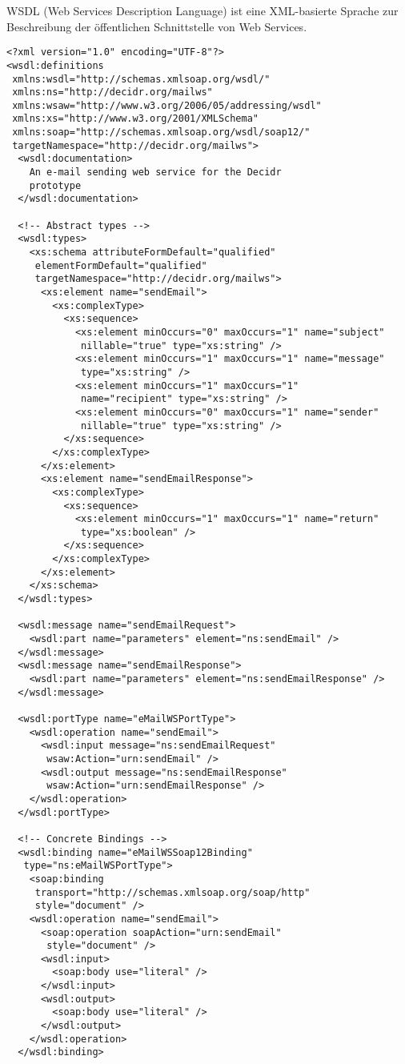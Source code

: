 \documentclass[runningheads]{llncs}
\begin{document}
    WSDL (Web Services Description Language) ist eine XML-basierte Sprache zur Beschreibung der öffentlichen Schnittstelle von Web Services.

    \newpage
    \label{ex_wsdl}
    \begin{verbatim}
<?xml version="1.0" encoding="UTF-8"?>
<wsdl:definitions
 xmlns:wsdl="http://schemas.xmlsoap.org/wsdl/"
 xmlns:ns="http://decidr.org/mailws"
 xmlns:wsaw="http://www.w3.org/2006/05/addressing/wsdl"
 xmlns:xs="http://www.w3.org/2001/XMLSchema"
 xmlns:soap="http://schemas.xmlsoap.org/wsdl/soap12/"
 targetNamespace="http://decidr.org/mailws">
  <wsdl:documentation>
    An e-mail sending web service for the Decidr
    prototype
  </wsdl:documentation>

  <!-- Abstract types -->
  <wsdl:types>
    <xs:schema attributeFormDefault="qualified"
     elementFormDefault="qualified"
     targetNamespace="http://decidr.org/mailws">
      <xs:element name="sendEmail">
        <xs:complexType>
          <xs:sequence>
            <xs:element minOccurs="0" maxOccurs="1" name="subject"
             nillable="true" type="xs:string" />
            <xs:element minOccurs="1" maxOccurs="1" name="message"
             type="xs:string" />
            <xs:element minOccurs="1" maxOccurs="1"
             name="recipient" type="xs:string" />
            <xs:element minOccurs="0" maxOccurs="1" name="sender"
             nillable="true" type="xs:string" />
          </xs:sequence>
        </xs:complexType>
      </xs:element>
      <xs:element name="sendEmailResponse">
        <xs:complexType>
          <xs:sequence>
            <xs:element minOccurs="1" maxOccurs="1" name="return"
             type="xs:boolean" />
          </xs:sequence>
        </xs:complexType>
      </xs:element>
    </xs:schema>
  </wsdl:types>

  <wsdl:message name="sendEmailRequest">
    <wsdl:part name="parameters" element="ns:sendEmail" />
  </wsdl:message>
  <wsdl:message name="sendEmailResponse">
    <wsdl:part name="parameters" element="ns:sendEmailResponse" />
  </wsdl:message>

  <wsdl:portType name="eMailWSPortType">
    <wsdl:operation name="sendEmail">
      <wsdl:input message="ns:sendEmailRequest"
       wsaw:Action="urn:sendEmail" />
      <wsdl:output message="ns:sendEmailResponse"
       wsaw:Action="urn:sendEmailResponse" />
    </wsdl:operation>
  </wsdl:portType>

  <!-- Concrete Bindings -->
  <wsdl:binding name="eMailWSSoap12Binding"
   type="ns:eMailWSPortType">
    <soap:binding
     transport="http://schemas.xmlsoap.org/soap/http"
     style="document" />
    <wsdl:operation name="sendEmail">
      <soap:operation soapAction="urn:sendEmail"
       style="document" />
      <wsdl:input>
        <soap:body use="literal" />
      </wsdl:input>
      <wsdl:output>
        <soap:body use="literal" />
      </wsdl:output>
    </wsdl:operation>
  </wsdl:binding>


\end{verbatim}
\end{document}
